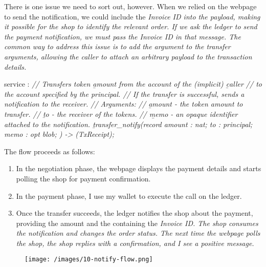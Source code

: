 \documentclass{article}
\begin{document}
There is one issue we need to sort out, however.
When we relied on the webpage to send the notification, we could include the \em{Invoice ID} into the payload, making it possible for the shop to identify the relevant order.
If we ask the ledger to send the payment notification, we must pass the \em{Invoice ID} in that message.
The common way to address this issue is to add the  argument to the transfer arguments, allowing the caller to attach an arbitrary payload to the transaction details.

\begin{code}[candid]
service : {
  \em{// Transfers token \b{amount} from the account of the (implicit) \b{caller}}
  \em{// to the account specified by the principal.}
  \em{// If the transfer is successful, sends a notification to the receiver.}
  \em{// Arguments:}
  \em{//   \b{amount} - the token amount to transfer.}
  \em{//   \b{to} - the receiver of the tokens.}
  \em{//   \b{memo} - an opaque identifier attached to the notification.}
  \b{transfer_notify}(record {
    amount : nat;
    to : principal;
    memo : opt blob;
  }) -> (TxReceipt);
}
\end{code}

The flow proceeds as follows:
\begin{enumerate}
  \item In the negotiation phase, the webpage displays the payment details and starts polling the shop for payment confirmation.
  \item In the payment phase, I use my wallet to execute the  call on the ledger.
  \item 
    Once the transfer succeeds, the ledger notifies the shop about the payment, providing the amount and the  containing the \em{Invoice ID}.
    The shop consumes the notification and changes the order status.
    The next time the webpage polls the shop, the shop replies with a confirmation, and I see a positive message.
\end{enumerate}

\begin{figure}[grayscale-diagram]
\texttt{[image: /images/10-notify-flow.png]}
\end{figure}
\end{document}
